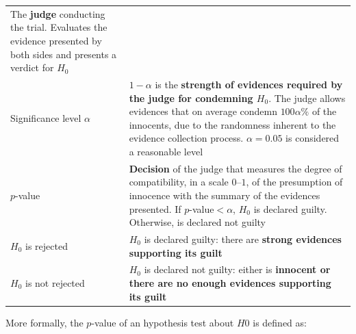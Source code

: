 \documentclass[]{book}
\theoremstyle{definition}
\theoremstyle{definition}
\theoremstyle{definition}
\theoremstyle{remark}
\begin{document}
\begin{longtable}[]{@{}ll@{}}
\begin{minipage}[t]{0.56\columnwidth}
The \textbf{judge} conducting the trial. Evaluates the evidence
presented by both sides and presents a verdict for \(H_0\)\strut
\end{minipage}\tabularnewline
\begin{minipage}[t]{0.38\columnwidth}\raggedright\strut
Significance level \(\alpha\)\strut
\end{minipage} & \begin{minipage}[t]{0.56\columnwidth}\raggedright\strut
\(1-\alpha\) is the \textbf{strength of evidences required by the judge
for condemning \(H_0\)}. The judge allows evidences that on average
condemn \(100\alpha\%\) of the innocents, due to the randomness inherent
to the evidence collection process. \(\alpha=0.05\) is considered a
reasonable level\strut
\end{minipage}\tabularnewline
\begin{minipage}[t]{0.38\columnwidth}\raggedright\strut
\(p\)-value\strut
\end{minipage} & \begin{minipage}[t]{0.56\columnwidth}\raggedright\strut
\textbf{Decision} of the judge that measures the degree of
compatibility, in a scale \(0\)--\(1\), of the presumption of innocence
with the summary of the evidences presented. If \(p\)-value\(<\alpha\),
\(H_0\) is declared guilty. Otherwise, is declared not guilty\strut
\end{minipage}\tabularnewline
\begin{minipage}[t]{0.38\columnwidth}\raggedright\strut
\(H_0\) is rejected\strut
\end{minipage} & \begin{minipage}[t]{0.56\columnwidth}\raggedright\strut
\(H_0\) is declared guilty: there are \textbf{strong evidences
supporting its guilt}\strut
\end{minipage}\tabularnewline
\begin{minipage}[t]{0.38\columnwidth}\raggedright\strut
\(H_0\) is not rejected\strut
\end{minipage} & \begin{minipage}[t]{0.56\columnwidth}\raggedright\strut
\(H_0\) is declared not guilty: either is \textbf{innocent or there are
no enough evidences supporting its guilt}\strut
\end{minipage}\tabularnewline
\bottomrule
\end{longtable}

More formally, the \(p\)-value of an hypothesis test about \(H0\) is
defined as:
\end{document}
